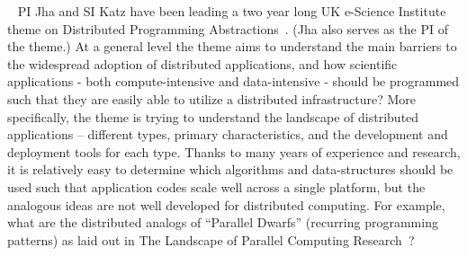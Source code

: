 \documentclass[10pt,letterpaper]{article}
\begin{document}


~\label{dpa}
PI Jha and SI Katz have been leading a two year long UK e-Science
Institute theme on Distributed Programming
Abstractions~\cite{dpa-paper,dpa-wiki}.  (Jha also serves as the PI of
the theme.) At a general level the theme aims to understand the main
barriers to the widespread adoption of distributed applications, and
how scientific applications - both compute-intensive and
data-intensive - should be programmed such that they are easily able
to utilize a distributed infrastructure? More specifically, the theme
is trying to understand the landscape of distributed applications --
different types, primary characteristics, and the development and
deployment tools for each type.  Thanks to many years of experience
and research, it is relatively easy to determine which algorithms and
data-structures should be used such that application codes scale well
across a single platform, but the analogous ideas are not well
developed for distributed computing.  For example, what are the
distributed analogs of ``Parallel Dwarfs'' (recurring programming
patterns) as laid out in The Landscape of Parallel Computing
Research~\cite{landscape}?
\end{document}
